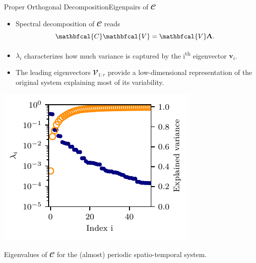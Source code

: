 \documentclass[usenames,dvipsnames,svgnames,10pt,aspectratio=169]{beamer}
\begin{document}
\begin{frame}[t, c]{Proper Orthogonal Decomposition}{Eigenpairs of $\mathbfcal{C}$}
	\begin{minipage}{.48\textwidth}
		\begin{itemize}
			\item Spectral decomposition of $\mathbfcal{C}$ reads
			$$\mathbfcal{C} \mathbfcal{V} = \mathbfcal{V} \boldsymbol{\Uplambda}.$$

			\bigskip

			\item $\lambda_i$ characterizes how much variance is captured by the i\textsuperscript{th} eigenvector $\mathbf{v}_i$.

			\bigskip

			\item The leading eigenvectors $\mathbfcal{V}_{1:r}$ provide a low-dimensional representation of the original system explaining most of its variability.
		\end{itemize}
	\end{minipage}%
	\begin{minipage}{.48\textwidth}
		\centering
		\includegraphics[width=.75\textwidth]{explained_variance_plot}

		{\small Eigenvalues of $\mathbfcal{C}$ for the (almost) periodic spatio-temporal system.}
	\end{minipage}

	\vspace{1cm}
\end{frame}
\end{document}
